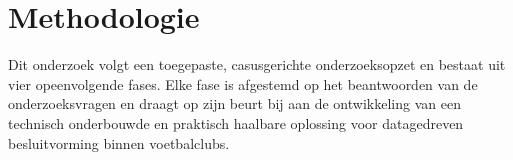 \section{Methodologie}%
\label{sec:methodologie}








Dit onderzoek volgt een toegepaste, casusgerichte onderzoeksopzet en bestaat uit vier opeenvolgende fases.
Elke fase is afgestemd op het beantwoorden van de onderzoeksvragen en draagt op zijn beurt bij aan de ontwikkeling van een technisch onderbouwde en praktisch haalbare oplossing voor datagedreven besluitvorming binnen voetbalclubs.


